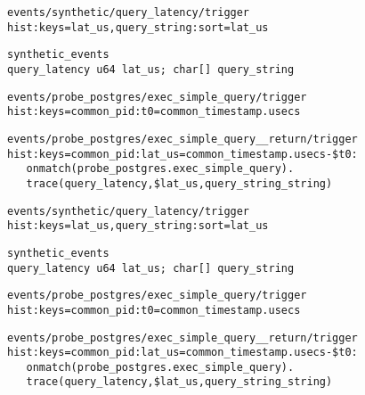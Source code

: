 \documentclass[usenames,dvipsnames, 18pt, compress, aspectratio=169]{beamer}
\begin{document}
\begin{frame}[fragile]{}
\begin{center}
\begin{overprint}[14.5cm]
		\vspace{-0.73cm}
        \begin{verbatim}
events/synthetic/query_latency/trigger
hist:keys=lat_us,query_string:sort=lat_us
        \end{verbatim}

        \begin{verbatim}
synthetic_events
query_latency u64 lat_us; char[] query_string
        \end{verbatim}

		\vspace{-0.73cm}
        \begin{verbatim}
events/probe_postgres/exec_simple_query/trigger
hist:keys=common_pid:t0=common_timestamp.usecs
        \end{verbatim}

		\vspace{-0.73cm}
        \begin{verbatim}
events/probe_postgres/exec_simple_query__return/trigger
hist:keys=common_pid:lat_us=common_timestamp.usecs-$t0:
   onmatch(probe_postgres.exec_simple_query).
   trace(query_latency,$lat_us,query_string_string)
        \end{verbatim}

		\vspace{-0.73cm}
        \begin{verbatim}
events/synthetic/query_latency/trigger
hist:keys=lat_us,query_string:sort=lat_us
        \end{verbatim}

        \begin{verbatim}
synthetic_events
query_latency u64 lat_us; char[] query_string
        \end{verbatim}

		\vspace{-0.73cm}
        \begin{verbatim}
events/probe_postgres/exec_simple_query/trigger
hist:keys=common_pid:t0=common_timestamp.usecs
        \end{verbatim}

		\vspace{-0.73cm}
        \begin{verbatim}
events/probe_postgres/exec_simple_query__return/trigger
hist:keys=common_pid:lat_us=common_timestamp.usecs-$t0:
   onmatch(probe_postgres.exec_simple_query).
   trace(query_latency,$lat_us,query_string_string)
        \end{verbatim}


\end{overprint}
\end{center}
\end{frame}
\end{document}
